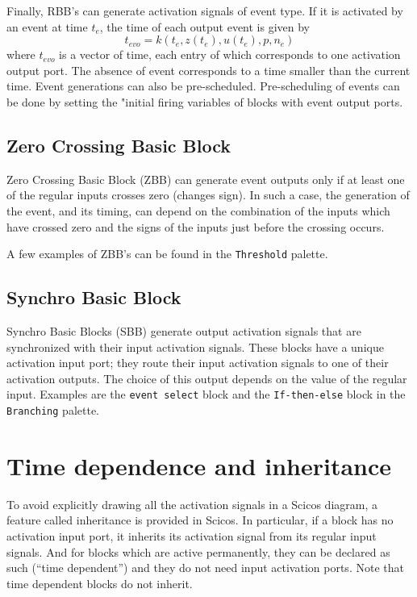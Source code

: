 \documentclass{article}
\begin{document}
Finally, RBB's can generate activation signals of event type.
If it is activated by an event at time $t_e$, the time 
of each output event is given by
\begin{equation}
t_{evo} = k(t_e,z(t_e),u(t_e),p,n_{e})  \label{e20}
\end{equation}
where $t_{evo}$ is a vector of time, each entry of which corresponds to one activation output port. 
The absence of event corresponds to a time smaller than the current time. 
Event generations can also be pre-scheduled. Pre-scheduling of events
can  be done by setting the "initial  firing variables of blocks 
with event output ports.  


\subsection{Zero Crossing Basic Block} 
Zero Crossing Basic Block (ZBB)  can generate event outputs only if at least
one of the regular inputs crosses zero (changes sign). In such a case, the
generation of the event, and its timing, can depend on the combination of
the inputs which have crossed zero and the signs of the inputs just
before the crossing occurs. 

A few examples of ZBB's can be found in the {\tt Threshold} palette. 


\subsection{Synchro Basic Block}
\label{syn}
Synchro Basic Blocks (SBB) generate output activation signals that are
synchronized with their input activation signals. These blocks have a
unique activation input port; they route their input activation signals
to one of their activation outputs. The choice of this output depends
on the value of the regular input. Examples are
the {\tt event select} block and
the {\tt If-then-else} block in the {\tt Branching} palette.



\section{Time dependence and inheritance}
To avoid explicitly drawing all the activation
signals in a Scicos diagram, a feature called inheritance is
provided in Scicos. In particular, if a block has no activation input port, it inherits its
activation signal from its regular input signals. And for blocks which are active 
permanently, they can be declared as such (``time dependent'') and they do not
need input activation ports. Note that time dependent blocks do not inherit.
\end{document}
